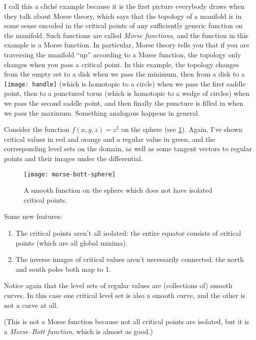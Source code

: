 \begin{remark}
	I call this a cliché example because it is the first picture everybody draws when they talk about Morse theory, which says that the topology of a manifold is in some sense encoded in the critical points of any sufficiently generic function on the manifold. Such functions are called \emph{Morse functions}, and the function in this example is a Morse function. In particular, Morse theory tells you that if you are traversing the manifold ``up'' according to a Morse function, the topology only changes when you pass a critical point. In this example, the topology changes from the empty set to a disk when we pass the minimum, then from a disk to a \texttt{[image: handle]} (which is homotopic to a circle) when we pass the first saddle point, then to a punctured torus (which is homotopic to a wedge of circles) when we pass the second saddle point, and then finally the puncture is filled in when we pass the maximum. Something analogous happens in general.
\end{remark}

\begin{example}
	Consider the function $f(x,y,z) = z^2$ on the sphere (see \cref{fig:sphere}). Again, I've shown critical values in red and orange and a regular value in green, and the corresponding level sets on the domain, as well as some tangent vectors to regular points and their images under the differential.
	
		\begin{figure}[htbp]
			\centering
				\texttt{[image: morse-bott-sphere]}
			\caption{A smooth function on the sphere which does not have isolated critical points.}
			\label{fig:sphere}
		\end{figure}
	
	Some new features:
	\begin{enumerate}
		\item The critical points aren't all isolated: the entire equator consists of critical points (which are all global minima).
		
		\item The inverse images of critical values aren't necessarily connected: the north and south poles both map to 1.
	\end{enumerate}
	
	Notice again that the level sets of regular values are (collections of) smooth curves. In this case one critical level set is also a smooth curve, and the other is not a curve at all.
	
	(This is not a Morse function because not all critical points are isolated, but it is a \emph{Morse–Bott function}, which is almost as good.)
	\end{example}
	
